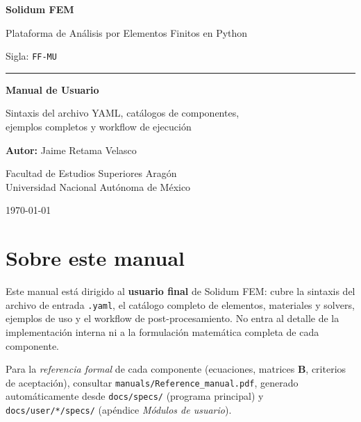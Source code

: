 \documentclass[11pt,oneside]{report}
\begin{document}

\begin{titlepage}
    \centering
    \vspace*{2cm}
    {\Huge\bfseries\color{yamlkey} Solidum FEM \par}
    \vspace{1cm}
    {\LARGE Plataforma de Análisis por Elementos Finitos en Python \par}
    \vspace{0.3cm}
    {\normalsize\color{darkgray} Sigla: \texttt{FF-MU} \par}
    \vspace{0.5cm}
    \rule{\linewidth}{0.5mm} \par
    \vspace{2cm}
    {\huge\bfseries Manual de Usuario \par}
    \vspace{2cm}
    {\large Sintaxis del archivo YAML, catálogos de componentes,\\
            ejemplos completos y workflow de ejecución\par}
    \vspace{1cm}
    {\Large \textbf{Autor:} Jaime Retama Velasco \par}
    \vspace{0.5cm}
    {\large Facultad de Estudios Superiores Aragón \\ Universidad Nacional Autónoma de México \par}
    \vfill
    {\large \today \par}
\end{titlepage}

\setcounter{page}{1}
\tableofcontents
\newpage

\chapter*{Sobre este manual}
\noindent Este manual está dirigido al \textbf{usuario final} de Solidum FEM: cubre la sintaxis del archivo de entrada \texttt{.yaml}, el catálogo completo de elementos, materiales y solvers, ejemplos de uso y el workflow de post-procesamiento. No entra al detalle de la implementación interna ni a la formulación matemática completa de cada componente.

Para la \emph{referencia formal} de cada componente (ecuaciones, matrices $\mathbf B$, criterios de aceptación), consultar \texttt{manuals/Reference\_manual.pdf}, generado automáticamente desde \texttt{docs/specs/} (programa principal) y \texttt{docs/user/*/specs/} (apéndice \emph{Módulos de usuario}).
\end{document}
